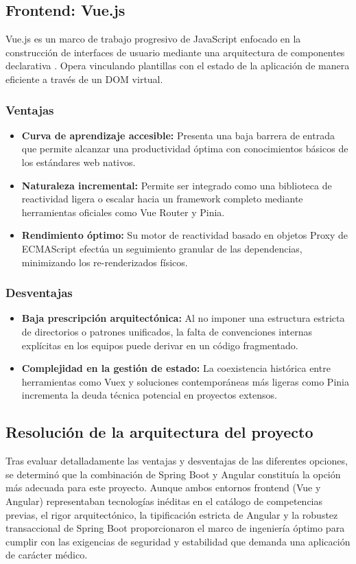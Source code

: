 \subsection{Frontend: Vue.js}
Vue.js es un marco de trabajo progresivo de JavaScript enfocado en la construcción de interfaces de usuario mediante una arquitectura de componentes declarativa \cite{VueDocs}. Opera vinculando plantillas con el estado de la aplicación de manera eficiente a través de un DOM virtual.

\subsubsection{Ventajas}
\begin{itemize}
    \item \textbf{Curva de aprendizaje accesible:} Presenta una baja barrera de entrada que permite alcanzar una productividad óptima con conocimientos básicos de los estándares web nativos.
    \item \textbf{Naturaleza incremental:} Permite ser integrado como una biblioteca de reactividad ligera o escalar hacia un framework completo mediante herramientas oficiales como Vue Router y Pinia.
    \item \textbf{Rendimiento óptimo:} Su motor de reactividad basado en objetos Proxy de ECMAScript efectúa un seguimiento granular de las dependencias, minimizando los re-renderizados físicos.
\end{itemize}

\subsubsection{Desventajas}
\begin{itemize}
    \item \textbf{Baja prescripción arquitectónica:} Al no imponer una estructura estricta de directorios o patrones unificados, la falta de convenciones internas explícitas en los equipos puede derivar en un código fragmentado.
    \item \textbf{Complejidad en la gestión de estado:} La coexistencia histórica entre herramientas como Vuex y soluciones contemporáneas más ligeras como Pinia incrementa la deuda técnica potencial en proyectos extensos.
\end{itemize}

\subsection{Resolución de la arquitectura del proyecto}
Tras evaluar detalladamente las ventajas y desventajas de las diferentes opciones, se determinó que la combinación de Spring Boot y Angular constituía la opción más adecuada para este proyecto. Aunque ambos entornos frontend (Vue y Angular) representaban tecnologías inéditas en el catálogo de competencias previas, el rigor arquitectónico, la tipificación estricta de Angular y la robustez transaccional de Spring Boot proporcionaron el marco de ingeniería óptimo para cumplir con las exigencias de seguridad y estabilidad que demanda una aplicación de carácter médico.